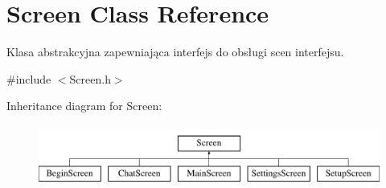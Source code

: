 \hypertarget{class_screen}{}\section{Screen Class Reference}
\label{class_screen}


Klasa abstrakcyjna zapewniająca interfejs do obsługi scen interfejsu.  




{\ttfamily \#include $<$Screen.\+h$>$}

Inheritance diagram for Screen\+:\begin{figure}[H]
\begin{center}
\leavevmode
\includegraphics[height=2.000000cm]{class_screen}
\end{center}
\end{figure}
